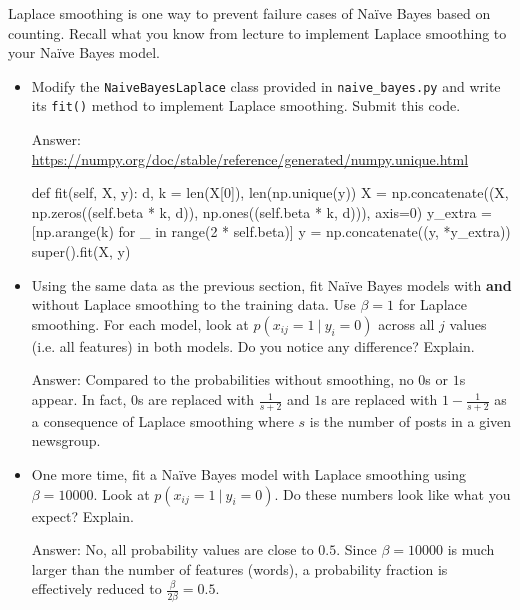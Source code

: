 \documentclass{article}
\newcommand{\blu}[1]{{\textcolor{blu}{#1}}}
\newenvironment{answer}{\par\begingroup\color{gre}Answer: }{\endgroup}
\let\ask\blu
\begin{document}
    Laplace smoothing is one way to prevent failure cases of Na\"ive Bayes based on counting. Recall what you know from lecture to implement Laplace smoothing to your Na\"ive Bayes model.
    \begin{itemize}
        \item Modify the \texttt{NaiveBayesLaplace} class provided in \texttt{naive\_bayes.py} and write its \texttt{fit()} method to implement Laplace smoothing. \ask{Submit this code.}
        \begin{answer}
            \url{https://numpy.org/doc/stable/reference/generated/numpy.unique.html}
        \end{answer}
        \begin{python}
def fit(self, X, y):
    d, k = len(X[0]), len(np.unique(y))
    X = np.concatenate((X, np.zeros((self.beta * k, d)), np.ones((self.beta * k, d))), axis=0)
    y_extra = [np.arange(k) for _ in range(2 * self.beta)]
    y = np.concatenate((y, *y_extra))
    super().fit(X, y)
        \end{python}

        \item Using the same data as the previous section, fit Na\"ive Bayes models with \textbf{and} without Laplace smoothing to the training data. Use $\beta=1$ for Laplace smoothing. For each model, look at $p(x_{ij} = 1 \ | \ y_i = 0)$ across all $j$ values (i.e. all features) in both models. \ask{Do you notice any difference? Explain.}
        \begin{answer}
            Compared to the probabilities without smoothing, no $0$s or $1$s appear. In fact, $0$s are replaced with $\frac{1}{s + 2}$ and $1$s are replaced with $1 - \frac{1}{s + 2}$ as a consequence of Laplace smoothing where $s$ is the number of posts in a given newsgroup.
        \end{answer}

        \item One more time, fit a Na\"ive Bayes model with Laplace smoothing using $\beta=10000$. Look at $p(x_{ij} = 1 \ | \ y_i = 0)$. \ask{Do these numbers look like what you expect? Explain.}
        \begin{answer}
            No, all probability values are close to $0.5$. Since $\beta = 10000$ is much larger than the number of features (words), a probability fraction is effectively reduced to $\frac{\beta}{2\beta}=0.5$.
        \end{answer}
    \end{itemize}
\end{document}
